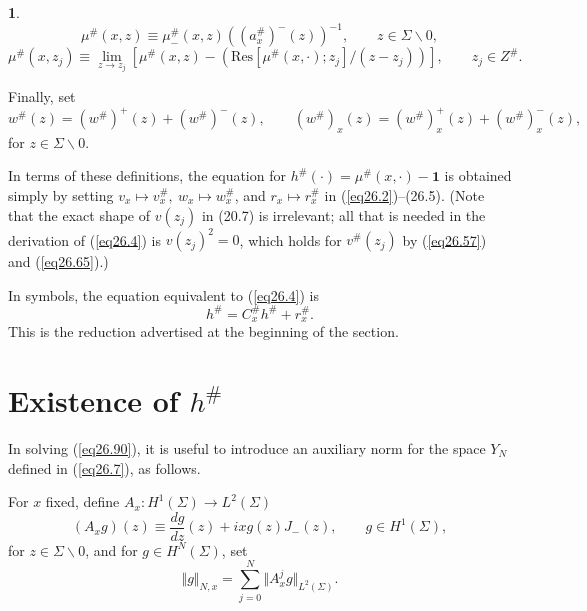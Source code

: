 \documentclass{surv-l}
\theoremstyle{plain}
\theoremstyle{definition}
\newtheorem{definition}[theorem]{\sc{Definition}}
\numberwithin{equation}{chapter}
\begin{document}
\renewcommand\thetheorem{26.\arabic{theorem}}
\setcounter{theorem}{85}
\begin{definition}\label{defi26.86}
\setcounter{equation}{86}
\begin{equation}\label{eq26.87}
\mu^{\#}(x, z)\equiv\mu_{-}^{\#}(x,z)((a_{x}^{\#})^{-}(z))^{-1},\qquad z\in\Sigma\backslash 0,
\end{equation}
\begin{equation}\label{eq26.88}
\mu^{\#} (x, z_{j})\displaystyle \equiv\lim_{z\rightarrow z_{j}}[\mu^{\#}(x, z)-(\mathrm{Res}[\mu^{\#}(x, \cdot); z_{j}]/(z-z_{j}))],\qquad z_{j}\in Z^{\#}.
\end{equation}

Finally, set
\begin{equation}\label{eq26.89}
w^{\#}(z)=(w^{\#})^{+}(z)+(w^{\#})^{-}(z),\qquad (w^{\#})_{x}(z)=(w^{\#})_{x}^{+}(z)+(w^{\#})_{x}^{-}(z),
\end{equation}
for $z\in\Sigma\backslash 0$.
\end{definition}

In terms of these definitions, the equation for $h^{\#}(\cdot)=\mu^{\#}(x, \cdot)-\mathbf{1}$ is obtained simply by setting $v_{x}\mapsto v_{x}^{\#},\ w_{x}\mapsto w_{x}^{\#}$, and $r_{x}\mapsto r_{x}^{\#}$ in (\ref{eq26.2})--(26.5). (Note that the exact shape of $v(z_{j})$ in (20.7) is irrelevant; all that is needed in the derivation of (\ref{eq26.4}) is $v(z_{j})^{2}=0$, which holds for $v^{\#}(z_{j})$ by (\ref{eq26.57}) and (\ref{eq26.65}).)

In symbols, the equation equivalent to (\ref{eq26.4}) is
\begin{equation}\label{eq26.90}
h^{\#}=C_{x}^{\#} h^{\#}+r_{x}^{\#}.
\end{equation}
This is the reduction advertised at the beginning of the section.

\section{Existence of $h^{\#}$}\label{sec27}
\renewcommand\theequation{\arabic{section}.\arabic{equation}}
In solving (\ref{eq26.90}), it is useful to introduce an auxiliary norm for the space $Y_{N}$ defined in (\ref{eq26.7}), as follows.

For $x$ fixed, define $A_{x}:H^{1}(\Sigma)\rightarrow L^{2}(\Sigma)$
\setcounter{equation}{0}
\begin{equation}\label{eq27.1}
(A_{x}g)(z)\equiv\frac{dg}{dz}(z)+ixg(z)J_{-}(z),\qquad g\in H^{1}(\Sigma),
\end{equation}
for $z\in\Sigma\backslash 0$, and for $g\in H^{N}(\Sigma)$, set 
\begin{equation}\label{eq27.2}
\Vert g\Vert_{N,x}=\sum_{j=0}^{N}\Vert A_{x}^{j}g\Vert_{L^{2}(\Sigma)}.
\end{equation}
\end{document}
